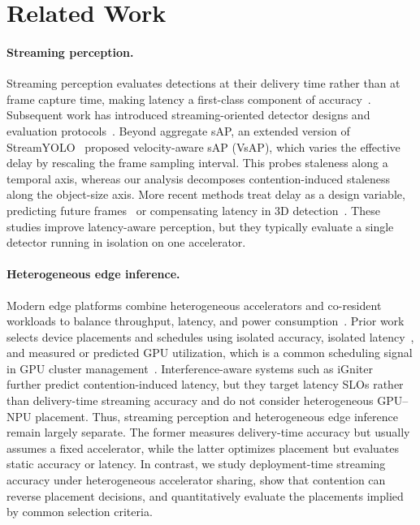 \documentclass[runningheads]{llncs}
\begin{document}
\section{Related Work}

\paragraph{Streaming perception.}
Streaming perception evaluates detections at their delivery time rather than at frame capture time, making latency a first-class component of accuracy~\cite{streaming-perception}. Subsequent work has introduced streaming-oriented detector designs and evaluation protocols~\cite{streamyolo,damo-streamnet,asap,longshortnet}. Beyond aggregate sAP, an extended version of StreamYOLO~\cite{streamyolo-vsap} proposed velocity-aware sAP (VsAP), which varies the effective delay by rescaling the frame sampling interval. This probes staleness along a temporal axis, whereas our analysis decomposes contention-induced staleness along the object-size axis. More recent methods treat delay as a design variable, predicting future frames~\cite{transtreaming} or compensating latency in 3D detection~\cite{lasp}. These studies improve latency-aware perception, but they typically evaluate a single detector running in isolation on one accelerator.

\paragraph{Heterogeneous edge inference.}
Modern edge platforms combine heterogeneous accelerators and co-resident workloads to balance throughput, latency, and power consumption~\cite{mobilint-aries}. Prior work selects device placements and schedules using isolated accuracy, isolated latency~\cite{tod,partitiontuner,ngs,rl-scheduler}, and measured or predicted GPU utilization, which is a common scheduling signal in GPU cluster management~\cite{gandiva,horus}. Interference-aware systems such as iGniter~\cite{igniter} further predict contention-induced latency, but they target latency SLOs rather than delivery-time streaming accuracy and do not consider heterogeneous GPU--NPU placement. Thus, streaming perception and heterogeneous edge inference remain largely separate. The former measures delivery-time accuracy but usually assumes a fixed accelerator, while the latter optimizes placement but evaluates static accuracy or latency. In contrast, we study deployment-time streaming accuracy under heterogeneous accelerator sharing, show that contention can reverse placement decisions, and quantitatively evaluate the placements implied by common selection criteria.
\end{document}
